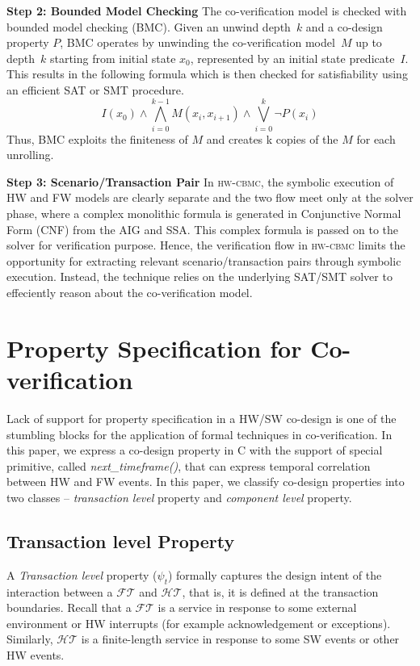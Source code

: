 \documentclass[sigconf]{acmart}
\newcommand{\tool}[1]{\textsc{#1}\xspace}
\newcommand{\hwcbmcv}{\tool{hw-cbmc}}
\newcommand{\Omit}[1]{}
\begin{document}
\textbf{Step 2: Bounded Model Checking}
%
The co-verification model is checked with bounded model checking (BMC).
Given an unwind depth~$k$ and a co-design property $P$, BMC operates
by unwinding the co-verification model~$M$ up to depth~$k$ starting from
initial state $x_0$, represented by an initial state predicate~$I$.
This results in the following formula which is then checked for
satisfiability using an efficient SAT or SMT procedure.
%
\[ I(x_0) \wedge \bigwedge_{i=0}^{k-1} M(x_i, x_{i+1}) \wedge \bigvee_{i=0}^{k} 
\neg P(x_i) \]
%
Thus, BMC exploits the finiteness of $M$ and creates k copies of the
$M$ for each unrolling. 



\textbf{Step 3: Scenario/Transaction Pair} In \hwcbmcv, the symbolic execution 
of HW and FW models are clearly separate and the two flow meet only at the
solver phase, where a complex monolithic formula is generated in 
Conjunctive Normal Form (CNF) from the AIG and SSA.  This complex formula 
is passed on to the solver for verification purpose.  
Hence, the verification flow in \hwcbmcv limits the opportunity for extracting 
relevant scenario/transaction pairs through symbolic execution.  Instead, the 
technique relies on the underlying SAT/SMT solver to effeciently reason about 
the co-verification model. 
%
\Omit{
The hardware and firmware run independently of each other. 
The communication between them takes place through these function calls. 
}
\section{Property Specification for Co-verification}\label{property}
Lack of support for property specification in a HW/SW co-design is one of the
stumbling blocks for the application of formal techniques in co-verification.  
In this paper, we express a co-design property in C 
with the support of special primitive, called {\em next\_timeframe()}, 
that can express temporal correlation between HW and FW events. 
In this paper, we classify co-design properties into two 
classes -- {\em transaction level} property and {\em component level} property.
\subsection{Transaction level Property}
A {\em Transaction level} property ($\psi_{t}$) formally captures the 
design intent of the interaction between a $\mathcal{FT}$ and $\mathcal{HT}$, 
that is, it is defined at the transaction boundaries.  
Recall that a $\mathcal{FT}$ is a service in response to some external environment 
or HW interrupts (for example acknowledgement or exceptions). Similarly, 
$\mathcal{HT}$ is a finite-length service in response to some SW events or 
other HW events. 
\end{document}
